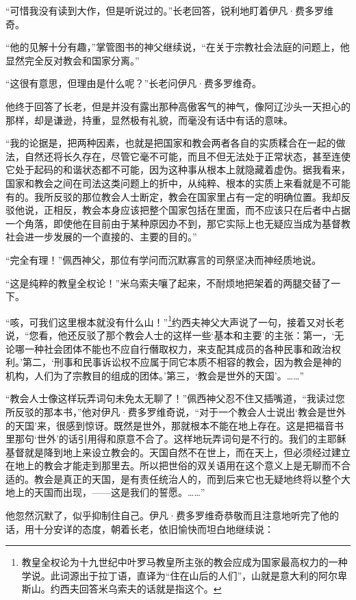 \par “可惜我没有读到大作，但是听说过的。”长老回答，锐利地盯着伊凡·费多罗维奇。
\par “他的见解十分有趣，”掌管图书的神父继续说，“在关于宗教社会法庭的问题上，他显然完全反对教会和国家分离。”
\par “这很有意思，但理由是什么呢？”长老问伊凡·费多罗维奇。
\par 他终于回答了长老，但是并没有露出那种高傲客气的神气，像阿辽沙头一天担心的那样，却是谦逊，持重，显然极有礼貌，而毫没有话中有话的意味。
\par “我的论据是，把两种因素，也就是把国家和教会两者各自的实质糅合在一起的做法，自然还将长久存在，尽管它毫不可能，而且不但无法处于正常状态，甚至连使它处于起码的和谐状态都不可能，因为这种事从根本上就隐藏着虚伪。据我看来，国家和教会之间在司法这类问题上的折中，从纯粹、根本的实质上来看就是不可能有的。我所反驳的那位教会人士断定，教会在国家里占有一定的明确位置。我却反驳他说，正相反，教会本身应该把整个国家包括在里面，而不应该只在后者中占据一个角落，即使他在目前由于某种原因办不到，那它实际上也无疑应当成为基督教社会进一步发展的一个直接的、主要的目的。”
\par “完全有理！”佩西神父，那位有学问而沉默寡言的司祭坚决而神经质地说。
\par “这是纯粹的教皇全权论！”米乌索夫嚷了起来，不耐烦地把架着的两腿交替了一下。
\par “咳，可我们这里根本就没有什么山！”\footnote{教皇全权论为十九世纪中叶罗马教皇所主张的教会应成为国家最高权力的一种学说。此词源出于拉丁语，直译为“住在山后的人们”，山就是意大利的阿尔卑斯山。约西夫回答米乌索夫的话就是指这个。}约西夫神父大声说了一句，接着又对长老说，“您看，他还反驳了那个教会人士的这样一些‘基本和主要’的主张：第一，‘无论哪一种社会团体不能也不应自行僭取权力，来支配其成员的各种民事和政治权利。’第二，‘刑事和民事诉讼权不应属于同它本质不相容的教会，因为教会是神的机构，人们为了宗教目的组成的团体。’第三，‘教会是世外的天国’。……”
\par “教会人士像这样玩弄词句未免太无聊了！”佩西神父忍不住又插嘴道，“我读过您所反驳的那本书，”他对伊凡·费多罗维奇说，“对于一个教会人士说出‘教会是世外的天国’来，很感到惊讶。既然是世外，那就根本不能在地上存在。这是把福音书里那句‘世外’的话引用得和原意不合了。这样地玩弄词句是不行的。我们的主耶稣基督就是降到地上来设立教会的。天国自然不在世上，而在天上，但必须经过建立在地上的教会才能走到那里去。所以把世俗的双关语用在这个意义上是无聊而不合适的。教会是真正的天国，是有责任统治人的，而到后来它也无疑地终将以整个大地上的天国而出现，——这是我们的誓愿。……”
\par 他忽然沉默了，似乎抑制住自己。伊凡·费多罗维奇恭敬而且注意地听完了他的话，用十分安详的态度，朝着长老，依旧愉快而坦白地继续说：
